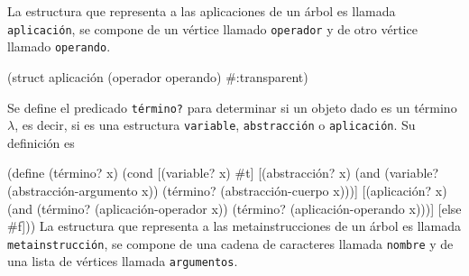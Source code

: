 \documentclass[letterpaper,twoside,openright,10pt]{book}
\begin{document}
La estructura que representa a las aplicaciones de un árbol es llamada {\tt{}\protect{}aplicación}, se compone de un vértice llamado {\tt{}operador} y de otro vértice llamado {\tt{}operando}.


\nwenddocs{}\plusendmoddef
(struct aplicación (operador operando) #:transparent)
\eatline
{}\nwendcode{}\nwdocspar

Se define el predicado {\tt{}\protect{}término?} para determinar si un objeto dado es un término \( λ \), es decir, si es una estructura {\tt{}\protect{}variable}, {\tt{}\protect{}abstracción} o {\tt{}\protect{}aplicación}. Su definición es

\nwenddocs{}\endmoddef
(define (término? x)
  (cond
   [(variable? x) #t]
   [(abstracción? x)
    (and (variable? (abstracción-argumento x))
         (término? (abstracción-cuerpo x)))]
   [(aplicación? x)
    (and (término? (aplicación-operador x))
         (término? (aplicación-operando x)))]
   [else #f]))
\eatline
{}\nwendcode{}\nwdocspar
La estructura que representa a las metainstrucciones de un árbol es llamada {\tt{}\protect{}metainstrucción}, se compone de una cadena de caracteres llamada {\tt{}nombre} y de una lista de vértices llamada {\tt{}argumentos}.
\end{document}

